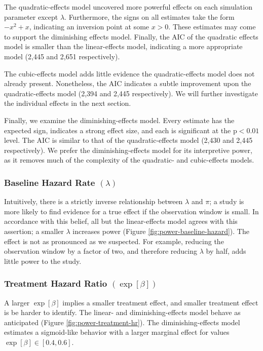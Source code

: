 The quadratic-effects model uncovered more powerful effects on each simulation parameter except $\lambda$. Furthermore, the signs on all estimates take the form $-x^2 + x$, indicating an inversion point at some $x > 0$. These estimates may come to support the diminishing effects model. Finally, the AIC of the quadratic effects model is smaller than the linear-effects model, indicating a more appropriate model (2,445 and 2,651 respectively).

The cubic-effects model adds little evidence the quadratic-effects model does not already present. Nonetheless, the AIC indicates a subtle improvement upon the quadratic-effects model (2,394 and 2,445 respectively). We will further investigate the individual effects in the next section. 

Finally, we examine the diminishing-effects model. Every estimate has the expected sign, indicates a strong effect size, and each is significant at the $\text{p} < 0.01$ level. The AIC is similar to that of the quadratic-effects model (2,430 and 2,445 respectively). We prefer the diminishing-effects model for its interpretive power, as it removes much of the complexity of the quadratic- and cubic-effects models.

\subsubsection{Baseline Hazard Rate $(\lambda)$}

Intuitively, there is a strictly inverse relationship between $\lambda$ and $\pi$; a study is more likely to find evidence for a true effect if the observation window is small. In accordance with this belief, all but the linear-effects model agrees with this assertion; a smaller $\lambda$ increases power (Figure \ref{fig:power-baseline-hazard}).  The effect is not as pronounced as we suspected. For example, reducing the observation window by a factor of two, and therefore reducing $\lambda$ by half, adds little power to the study.

\subsubsection{Treatment Hazard Ratio $(\exp[\beta])$}

A larger $\exp[\beta]$ implies a smaller treatment effect\footnotemark, and smaller treatment effect is be harder to identify. The linear- and diminishing-effects model behave as anticipated (Figure \ref{fig:power-treatment-hr}). The diminishing-effects model estimates a sigmoid-like behavior with a larger marginal effect for values $\exp[\beta] \in [0.4, 0.6]$. 

